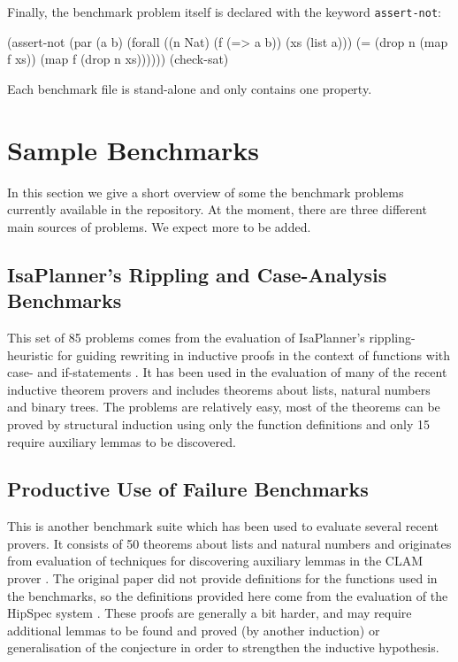\documentclass{llncs}
\begin{document}
Finally, the benchmark problem itself is declared with the keyword \texttt{assert-not}:

\begin{code}
(assert-not
  (par (a b)
    (forall ((n Nat) (f (=> a b)) (xs (list a)))
      (= (drop n (map f xs)) (map f (drop n xs))))))
(check-sat)
\end{code}
Each benchmark file is stand-alone and only contains one property.

\section{Sample Benchmarks}
In this section we give a short overview of some the benchmark problems currently available in the repository. At the moment, there are three different main sources of problems. We expect more to be added.

\subsection{IsaPlanner's Rippling and Case-Analysis Benchmarks}
\label{sec:isap}
This set of 85 problems comes from the evaluation of IsaPlanner's rippling-heuristic for guiding rewriting in inductive proofs in the context of functions with case- and if-statements \cite{IsaPcase}. It has been used in the evaluation of many of the recent inductive theorem provers and includes theorems about lists, natural numbers and binary trees. The problems are relatively easy, most of the theorems can be proved by structural induction using only the function definitions and only 15 require auxiliary lemmas to be discovered.

\subsection{Productive Use of Failure Benchmarks}
This is another benchmark suite which has been used to evaluate several recent provers. It consists of 50 theorems about lists and natural numbers and originates from evaluation of techniques for discovering auxiliary lemmas in the CLAM prover \cite{productiveuse}. The original paper did not provide definitions for the functions used in the benchmarks, so the definitions provided here come from the evaluation of the HipSpec system \cite{hipspecCADE}. These proofs are generally a bit harder, and may require additional lemmas to be found and proved (by another induction) or generalisation of the conjecture in order to strengthen the inductive hypothesis.
\end{document}
